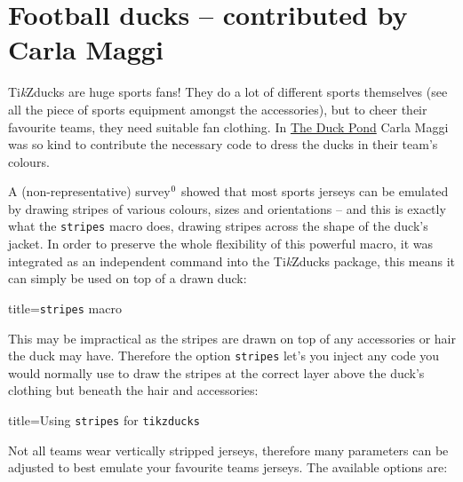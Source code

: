 \documentclass[parskip=half]{scrartcl}
\newcommand{\tikzducks}{Ti\emph{k}Zducks\xspace}
\begin{document}
\clearpage
\section{Football ducks -- contributed by Carla Maggi}
\label{sec:footballducks}

\tikzducks are huge sports fans! They do a lot of different sports themselves (see all the piece of sports equipment amongst the accessories), but to cheer their favourite teams, they need suitable fan clothing. In \href{https://tex.stackexchange.com/a/387126/36296}{The Duck Pond} Carla Maggi was so kind to contribute the necessary code to dress the ducks in their team's colours.

\addtocounter{footnote}{1}
A (non-representative) survey$^\thefootnote$ showed that most sports jerseys can be emulated by drawing stripes of various colours, sizes and orientations -- and this is exactly what the \lstinline|stripes| macro does, drawing stripes across the shape of the duck's jacket. In order to preserve the whole flexibility of this powerful macro, it was integrated as an independent command into the \tikzducks package, this means it can simply be used on top of a drawn duck:

\begin{tcblisting}{title={\texttt{stripes} macro}}
\begin{tikzpicture}
	\duck
	\stripes
\end{tikzpicture}
\end{tcblisting}

This may be impractical as the stripes are drawn on top of any accessories or hair the duck may have. Therefore the option \lstinline|stripes| let's you inject any code you would normally use to draw the stripes at the correct layer above the duck's clothing but beneath the hair and accessories:

\begin{tcblisting}{title={Using \texttt{stripes} for \texttt{tikzducks}}}
\begin{tikzpicture}
	\duck[longhair,|stripes|={\stripes}]
\end{tikzpicture}
\end{tcblisting}

Not all teams wear vertically stripped jerseys, therefore many parameters can be adjusted to best emulate your favourite teams jerseys. The available options are:
\end{document}
